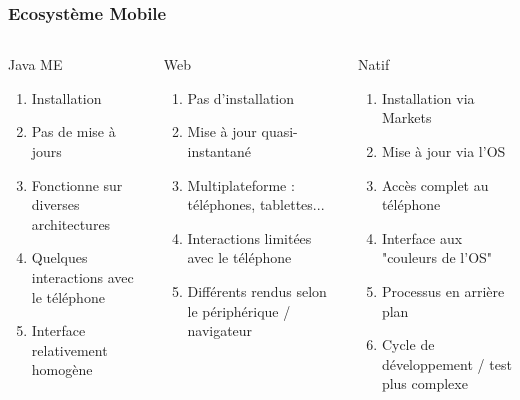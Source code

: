 \documentclass{beamer}
\begin{document}
\begin{frame}
\frametitle{Ecosystème Mobile}
\begin{columns}[t]
  \begin{column}{3.5cm}
  \begin{block}{Java ME}
    \begin{enumerate}[-]
    \item Installation
    \item Pas de mise à jours
    \item Fonctionne sur diverses architectures
    \item Quelques interactions avec le téléphone
    \item Interface relativement homogène
    \end{enumerate}
  \end{block} 
  \end{column}
  
  \begin{column}{3.5cm}
  \begin{block}{Web}
    \begin{enumerate}[-]
    \item Pas d'installation
    \item Mise à jour quasi-instantané
    \item Multiplateforme : téléphones, tablettes...
    \item Interactions limitées avec le téléphone
    \item Différents rendus selon le périphérique / navigateur
    \end{enumerate}
  \end{block}   
  \end{column}

  \begin{column}{4cm}
  \begin{block}{Natif}
    \begin{enumerate}[-]
    \item Installation via Markets
    \item Mise à jour via l'OS
    \item Accès complet au téléphone
    \item Interface aux "couleurs de l'OS"
    \item Processus en arrière plan
    \item Cycle de développement / test plus complexe
    \end{enumerate}
  \end{block}
  \end{column}

\end{columns}
\end{frame}
\end{document}
